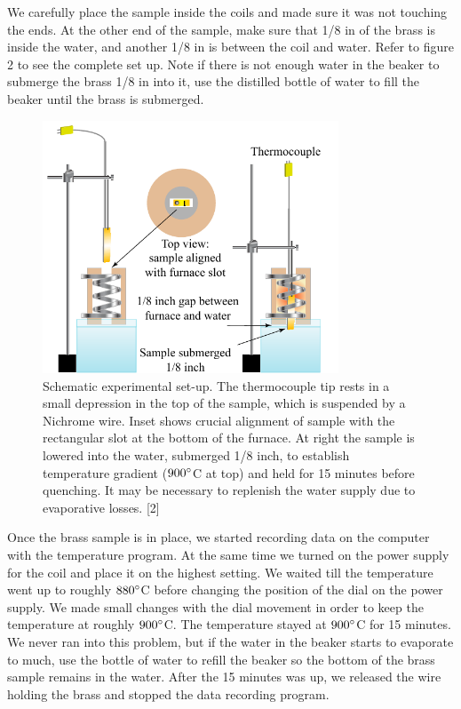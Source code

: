 \documentclass{article}
\begin{document}
We carefully place the sample inside the coils and made sure it was not touching the ends. At the other end of the sample, make sure that 1/8 in of the brass is inside the water, and another 1/8 in is between the coil and water. Refer to figure 2 to see the complete set up. Note if there is not enough water in the beaker to submerge the brass 1/8 in into it, use the distilled bottle of water to fill the beaker until the brass is submerged.
\begin{figure}[H]
\centering
\includegraphics[width=250pt]{figure1c2.pdf}
\caption{Schematic experimental set-up. The thermocouple tip rests in a small depression in the top of the sample, which is suspended by a Nichrome wire. Inset shows crucial alignment of sample with the rectangular slot at the bottom of the furnace. At right the sample is lowered into the water, submerged 1/8 inch, to establish temperature gradient ($900\degree$C at top) and held for 15 minutes before quenching. It may be necessary to replenish the water supply due to evaporative losses. [2]}
\end{figure}

Once the brass sample is in place, we started recording data on the computer with the temperature program. At the same time we turned on the power supply for the coil and place it on the highest setting. We waited till the temperature went up to roughly $880\degree$C before changing the position of the dial on the power supply. We made small changes with the dial movement in order to keep the temperature at roughly $900\degree$C. The temperature stayed at $900\degree$C for 15 minutes. We never ran into this problem, but if the water in the beaker starts to evaporate to much, use the bottle of water to refill the beaker so the bottom of the brass sample remains in the water. After the 15 minutes was up, we released the wire holding the brass and stopped the data recording program.
\end{document}
